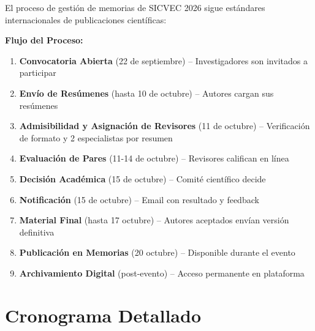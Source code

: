 \documentclass[12pt,a4paper]{article}
\begin{document}
El proceso de gestión de memorias de SICVEC 2026 sigue estándares internacionales de publicaciones científicas:

\begin{tcolorbox}[enhanced, colback=white, colframe=verdeosc, boxrule=1.5pt]

\textbf{Flujo del Proceso:}

\begin{enumerate}[label={\textcolor{verdemid}{\textbf{Paso \arabic{*}}}}]
  \item \textbf{Convocatoria Abierta} (22 de septiembre) -- Investigadores son invitados a participar
  \item \textbf{Envío de Resúmenes} (hasta 10 de octubre) -- Autores cargan sus resúmenes
  \item \textbf{Admisibilidad y Asignación de Revisores} (11 de octubre) -- Verificación de formato y 2 especialistas por resumen
  \item \textbf{Evaluación de Pares} (11-14 de octubre) -- Revisores califican en línea
  \item \textbf{Decisión Académica} (15 de octubre) -- Comité científico decide
  \item \textbf{Notificación} (15 de octubre) -- Email con resultado y feedback
  \item \textbf{Material Final} (hasta 17 octubre) -- Autores aceptados envían versión definitiva
  \item \textbf{Publicación en Memorias} (20 octubre) -- Disponible durante el evento
  \item \textbf{Archivamiento Digital} (post-evento) -- Acceso permanente en plataforma
\end{enumerate}

\end{tcolorbox}

\section{Cronograma Detallado}
\end{document}
